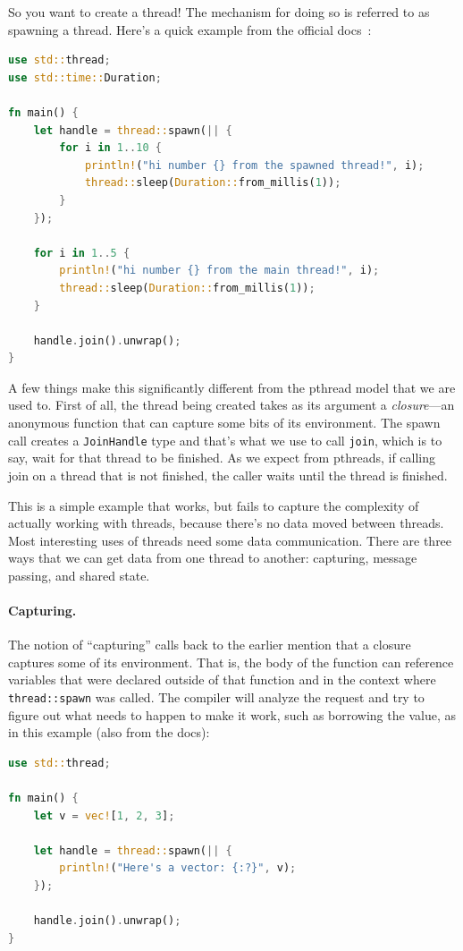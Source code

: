 \documentclass[a4paper]{report}
\begin{document}
So you want to create a thread! The mechanism for doing so is referred to as spawning a thread. Here's a quick example from the official docs~\cite{rustdocs}:

\begin{lstlisting}[language=Rust]
use std::thread;
use std::time::Duration;

fn main() {
    let handle = thread::spawn(|| {
        for i in 1..10 {
            println!("hi number {} from the spawned thread!", i);
            thread::sleep(Duration::from_millis(1));
        }
    });

    for i in 1..5 {
        println!("hi number {} from the main thread!", i);
        thread::sleep(Duration::from_millis(1));
    }

    handle.join().unwrap();
}
\end{lstlisting}

A few things make this significantly different from the pthread model that we are used to. First of all, the thread being created takes as its argument a \textit{closure}---an anonymous function that can capture some bits of its environment. The spawn call creates a \texttt{JoinHandle} type and that's what we use to call \texttt{join}, which is to say, wait for that thread to be finished. As we expect from pthreads, if calling join on a thread that is not finished, the caller waits until the thread is finished.

This is a simple example that works, but fails to capture the complexity of actually working with threads, because there's no data moved between threads. Most interesting uses of threads need some data communication. There are three ways that we can get data from one thread to another: capturing, message passing, and shared state.

\paragraph{Capturing.} 
The notion of ``capturing'' calls back to the earlier mention that a closure captures some of its environment. That is, the body of the function can reference variables that were declared outside of that function and in the context where \texttt{thread::spawn} was called. The compiler will analyze the request and try to figure out what needs to happen to make it work, such as borrowing the value, as in this example (also from the docs):

\begin{lstlisting}[language=Rust]
use std::thread;

fn main() {
    let v = vec![1, 2, 3];

    let handle = thread::spawn(|| {
        println!("Here's a vector: {:?}", v);
    });

    handle.join().unwrap();
}
\end{lstlisting}
\end{document}
